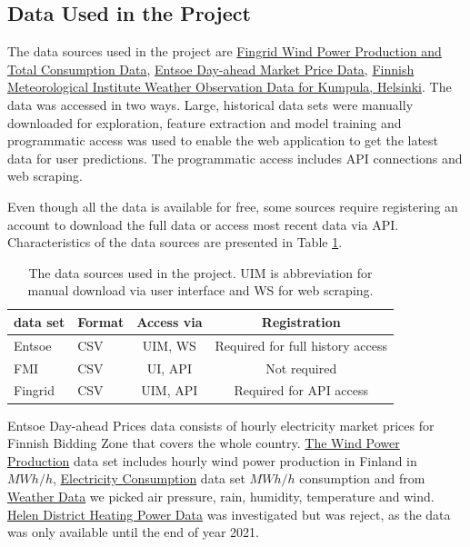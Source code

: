 \documentclass{article}
\begin{document}
\subsection{Data Used in the Project}
\label{subsection:datadescription}

The data sources used in the project are \href{https://data.fingrid.fi/en}{Fingrid Wind Power Production and Total Consumption Data}, \href{https://transparency.entsoe.eu}{Entsoe Day-ahead Market Price Data}, \href{https://en.ilmatieteenlaitos.fi/open-data}{Finnish Meteorological Institute Weather Observation Data for Kumpula, Helsinki}. The data was accessed in two ways. Large, historical data sets were manually downloaded for exploration, feature extraction and model training and programmatic access was used to enable the web application to get the latest data for user predictions. The programmatic access includes API connections and web scraping.

Even though all the data is available for free, some sources require registering an account to download the full data or access most recent data via API. Characteristics of the data sources are presented in Table \ref{table:source-characteristics}.

\begin{table}[b] 
\centering 
\begin{tabular}{l||l c c} 
data set & Format & Access via & Registration\\ 
\hline \hline
Entsoe & CSV & UIM, WS  & Required for full history access \\
FMI & CSV & UI, API & Not required \\
Fingrid & CSV & UIM, API & Required for API access \\
\hline
\end{tabular}
\caption{The data sources used in the project. UIM is abbreviation for manual download via user interface and WS for web scraping.}
\label{table:source-characteristics}
\end{table}

Entsoe Day-ahead Prices data consists of hourly electricity market prices for Finnish Bidding Zone that covers the whole country. \href{https://data.fingrid.fi/en/data set/wind-power-generation}{The Wind Power Production} data set includes hourly wind power production in Finland in $MWh/h$, \href{https://data.fingrid.fi/en/data set/electricity-consumption-in-finland}{Electricity Consumption} data set $MWh/h$ consumption and from \href{https://en.ilmatieteenlaitos.fi/open-data}{Weather Data} we picked air pressure, rain, humidity, temperature and wind. \href{https://www.helen.fi/en/company/responsibility/current-topics/open-data}{Helen District Heating Power Data} was investigated but was reject, as the data was only available until the end of year 2021.
\end{document}
